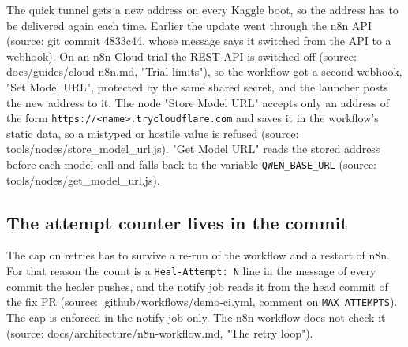 The quick tunnel gets a new address on every Kaggle boot, so the address has to be delivered again each time. Earlier the update went through the n8n API (source: git commit 4833c44, whose message says it switched from the API to a webhook). On an n8n Cloud trial the REST API is switched off (source: docs/\allowbreak{}guides/\allowbreak{}cloud-n8n.md, "Trial limits"), so the workflow got a second webhook, "Set Model URL", protected by the same shared secret, and the launcher posts the new address to it. The node "Store Model URL" accepts only an address of the form \texttt{https:\allowbreak{}/\allowbreak{}/\allowbreak{}\textless{}name\textgreater{}.\allowbreak{}trycloudflare.\allowbreak{}com} and saves it in the workflow's static data, so a mistyped or hostile value is refused (source: tools/\allowbreak{}nodes/\allowbreak{}store\_\allowbreak{}model\_\allowbreak{}url.js). "Get Model URL" reads the stored address before each model call and falls back to the variable \texttt{QWEN\_\allowbreak{}BASE\_\allowbreak{}URL} (source: tools/\allowbreak{}nodes/\allowbreak{}get\_\allowbreak{}model\_\allowbreak{}url.js).

\subsection{The attempt counter lives in the commit}

The cap on retries has to survive a re-run of the workflow and a restart of n8n. For that reason the count is a \texttt{Heal-\allowbreak{}Attempt:\allowbreak{} N} line in the message of every commit the healer pushes, and the notify job reads it from the head commit of the fix PR (source: .github/\allowbreak{}workflows/\allowbreak{}demo-ci.yml, comment on \texttt{MAX\_\allowbreak{}ATTEMPTS}). The cap is enforced in the notify job only. The n8n workflow does not check it (source: docs/\allowbreak{}architecture/\allowbreak{}n8n-workflow.md, "The retry loop").
